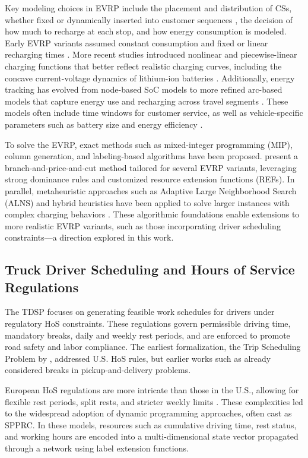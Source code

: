\documentclass[trsc,dblanonrev]{informs4}
\begin{document}
Key modeling choices in EVRP include the placement and distribution of CSs, whether fixed or dynamically inserted into customer sequences \citep{ lam2022branch}, the decision of how much to recharge at each stop, and how energy consumption is modeled. Early EVRP variants assumed constant consumption and fixed or linear recharging times \citep{conrad2011recharging}. More recent studies introduced nonlinear and piecewise-linear charging functions that better reflect realistic charging curves, including the concave current-voltage dynamics of lithium-ion batteries \citep{montoya2017electric}. Additionally, energy tracking has evolved from node-based SoC models to more refined arc-based models that capture energy use and recharging across travel segments \citep{froger2019improved}. These models often include time windows for customer service, as well as vehicle-specific parameters such as battery size and energy efficiency \citep{keskin2019electric, lam2022branch}.

To solve the EVRP, exact methods such as mixed-integer programming (MIP), column generation, and labeling-based algorithms have been proposed. \citet{desaulniers2016exact} present a branch-and-price-and-cut method tailored for several EVRP variants, leveraging strong dominance rules and customized resource extension functions (REFs). In parallel, metaheuristic approaches such as Adaptive Large Neighborhood Search (ALNS) and hybrid heuristics have been applied to solve larger instances with complex charging behaviors \citet{rodriguez2024new}. These algorithmic foundations enable extensions to more realistic EVRP variants, such as those incorporating driver scheduling constraints—a direction explored in this work.

\subsection{Truck Driver Scheduling and Hours of Service Regulations}

The TDSP focuses on generating feasible work schedules for drivers under regulatory HoS constraints. These regulations govern permissible driving time, mandatory breaks, daily and weekly rest periods, and are enforced to promote road safety and labor compliance. The earliest formalization, the Trip Scheduling Problem by \citet{archetti2009trip}, addressed U.S. HoS rules, but earlier works such as \citet{savelsbergh1998drive} already considered breaks in pickup-and-delivery problems.

European HoS regulations are more intricate than those in the U.S., allowing for flexible rest periods, split rests, and stricter weekly limits \citep{goel2009vehicle, drexl2010labelling}. These complexities led to the widespread adoption of dynamic programming approaches, often cast as SPPRC. In these models, resources such as cumulative driving time, rest status, and working hours are encoded into a multi-dimensional state vector propagated through a network using label extension functions.
\end{document}
